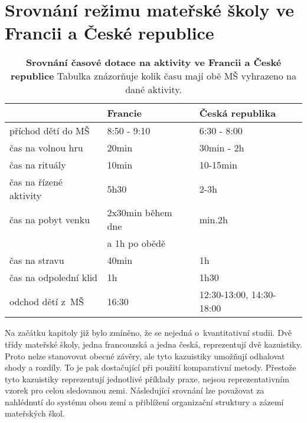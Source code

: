 \section{Srovnání režimu mateřské školy ve Francii a České republice} 
\label{srovnani} 

\begin{table}[h]
	\center
	\begin{tabular}{|l|l|l|}
	\hline
	\rowcolor{grey}
								& \textbf{Francie}				& \textbf{Česká republika}	\\
	\hline
	\hline
\rowcolor{grey!10}	 příchod dětí do MŠ			& 8:50 - 9:10				& 6:30 - 8:00			\\ 
\rowcolor{grey!50}	 čas na volnou hru 			& 20min 					&30min - 2h 	\\ 
\rowcolor{grey!10}	 čas na rituály 			&10min 						&10-15min \\
\rowcolor{grey!50}	 čas na řízené aktivity		&5h30 						&2-3h   \\ 
\rowcolor{grey!10}	 čas na pobyt venku     	&2x30min během dne			&min.2h 	\\ 
\rowcolor{grey!10}								&a 1h po obědě				& \\ 
\rowcolor{grey!50}	 čas na stravu				&40min						&1h \\
\rowcolor{grey!10}	 čas na odpolední klid 	 	&1h 						&1h30 	\\
\rowcolor{grey!50}	 odchod dětí z~MŠ			&16:30						&12:30-13:00, 14:30-18:00	\\														 
	 \hline
	  
	\end{tabular}
	
	\caption{ \textbf{Srovnání časové dotace na aktivity ve Francii a České republice} Tabulka znázorňuje kolik času mají obě MŠ vyhrazeno na dané aktivity.
	}
	\label{srovnanirezimdne}
\end{table}


	Na začátku kapitoly již bylo zmíněno, že se nejedná o~kvantitativní studii. Dvě třídy mateřské školy, jedna francouzská a jedna česká, reprezentují dvě kazuistiky. Proto nelze stanovovat obecné závěry, ale tyto kazuistiky umožňují odhalovat shody a rozdíly. To je pak dostačující při použití komparativní metody. Přestože tyto kazuistiky reprezentují jednotlivé příklady praxe, nejsou reprezentativním vzorek pro celou sledovanou zemi. Následující srovnání lze považovat za nahlédnutí do systému obou zemí a přiblížení organizační struktury a zázemí mateřských škol.

